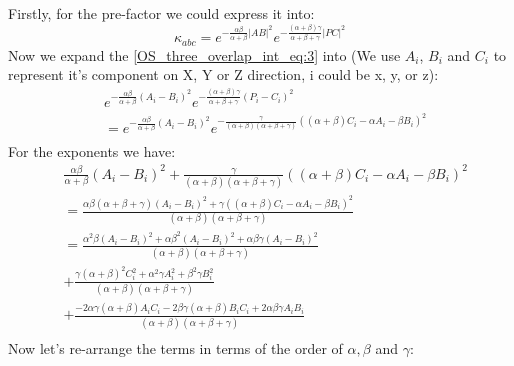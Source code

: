 Firstly, for the pre-factor we could express it into:
\begin{equation}
\kappa_{abc} = e^{-\frac{\alpha\beta}{\alpha+\beta}|AB|^{2}}
e^{-\frac{(\alpha+\beta)\gamma}{\alpha+\beta+\gamma}|PC|^{2}}
\label{OS_three_overlap_int_eq:3}
\end{equation}
Now we expand the \ref{OS_three_overlap_int_eq:3} into (We use $A_{i}$, $B_{i}$
and $C_{i}$ to represent it's component on X, Y or Z direction, i could be
x, y, or z):
\begin{equation}
 \begin{split}
 &e^{-\frac{\alpha\beta}{\alpha+\beta}(A_{i}-B_{i})^{2}}
e^{-\frac{(\alpha+\beta)\gamma}{\alpha+\beta+\gamma}(P_{i}-C_{i})^{2}} \\
&=e^{-\frac{\alpha\beta}{\alpha+\beta}(A_{i}-B_{i})^{2}} 
e^{-\frac{\gamma}{(\alpha+\beta)(\alpha+\beta+\gamma)}
((\alpha+\beta)C_{i}-\alpha A_{i} - \beta B_{i})^{2}} \\
 \end{split}
\label{OS_three_overlap_int_eq:4}
\end{equation}
For the exponents we have:
\begin{equation}
 \begin{split}
 & \frac{\alpha\beta}{\alpha+\beta}(A_{i}-B_{i})^{2}
+ \frac{\gamma}{(\alpha+\beta)(\alpha+\beta+\gamma)}
((\alpha+\beta)C_{i} -\alpha A_{i} - \beta B_{i})^{2} \\
&=  \frac{\alpha\beta(\alpha+\beta+\gamma)(A_{i}-B_{i})^{2}
+ \gamma((\alpha+\beta)C_{i} -\alpha A_{i} - \beta B_{i})^{2}}
{(\alpha+\beta)(\alpha+\beta+\gamma)} \\
&= \frac{\alpha^{2}\beta(A_{i}-B_{i})^{2} 
+ \alpha\beta^{2}(A_{i}-B_{i})^{2}+\alpha\beta\gamma(A_{i}-B_{i})^{2}}
{(\alpha+\beta)(\alpha+\beta+\gamma)} \\
&+ \frac{\gamma(\alpha+\beta)^{2}C_{i}^{2}+\alpha^{2}\gamma A_{i}^{2} +
\beta^{2}\gamma B_{i}^{2} }{(\alpha+\beta)(\alpha+\beta+\gamma)} \\
&+ \frac{-2\alpha\gamma(\alpha+\beta)A_{i}C_{i}
- 2\beta\gamma(\alpha+\beta)B_{i}C_{i} + 2\alpha\beta\gamma A_{i}B_{i}}
{(\alpha+\beta)(\alpha+\beta+\gamma)}  \\
 \end{split}
\label{OS_three_overlap_int_eq:5}
\end{equation}
Now let's re-arrange the terms in terms of the order of $\alpha, \beta$
and $\gamma$:
